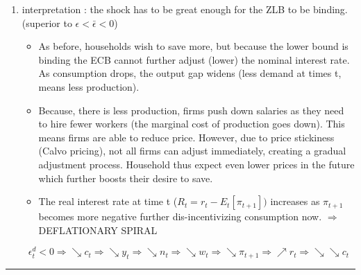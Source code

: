 \documentclass{article}
\begin{document}
\begin{itemize}
\begin{enumerate}
        \item interpretation : the shock has to be great enough for the ZLB to be binding. (superior to $\epsilon<\bar{\epsilon}<0$)
        \begin{interpretationbox}
            \begin{itemize}
                \item As before, households wish to save more, but because the lower bound is binding the ECB cannot further adjust (lower) the nominal interest rate. As consumption drops, the output gap widens (less demand at times t, means less production).
                \item  Because, there is less production, firms push down  salaries as they need to hire fewer workers (the marginal cost of production goes down). This means firms are able to reduce price. However, due to price stickiness (Calvo pricing), not all firms can adjust immediately, creating a gradual adjustment process. Household thus expect even lower prices in the future which further boosts their desire to save. 
                \item  The real interest rate at time t ($R_t = r_t-E_t[\pi_{t+1}])$ increases as $\pi_{t+1}$ becomes more negative further dis-incentivizing consumption now. $\Longrightarrow$ DEFLATIONARY SPIRAL
            \end{itemize}
        \begin{equation}
            \epsilon_t^d < 0 \Longrightarrow \searrow c_t \Longrightarrow \searrow y_t \Longrightarrow \searrow n_t \Longrightarrow \searrow w_t \Longrightarrow \searrow \pi_{t+1} \Longrightarrow \nearrow r_t \Longrightarrow \searrow \searrow c_t
        \end{equation}
        \end{interpretationbox}
    \end{enumerate}
\end{itemize}
        \noindent\rule{\textwidth}{0.4pt}
\end{document}
